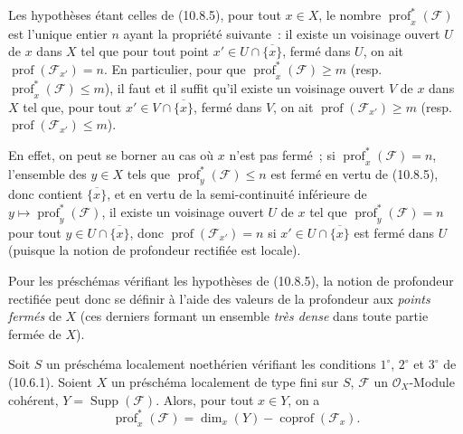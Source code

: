\begin{corollary}[10.8.6]
\label{IV.10.8.6-fr}
Les hypothèses étant celles de (10.8.5), pour tout $x\in X$, le nombre
$\operatorname{prof}^{*}_{x}(\mathcal F)$ est l'unique entier $n$ ayant la propriété
suivante~: il existe un voisinage ouvert $U$ de $x$ dans $X$ tel que pour tout
point $x'\in U\cap\overline{\{x\}}$, fermé dans $U$, on ait
$\operatorname{prof}(\mathcal F_{x'})=n$. En particulier, pour que
$\operatorname{prof}^{*}_{x}(\mathcal F)\geq m$ (resp.
$\operatorname{prof}^{*}_{x}(\mathcal F)\leq m$), il faut et il suffit qu'il existe
un voisinage ouvert $V$ de $x$ dans $X$ tel que, pour tout
$x'\in V\cap\overline{\{x\}}$, fermé dans $V$, on ait
$\operatorname{prof}(\mathcal F_{x'})\geq m$ (resp.
$\operatorname{prof}(\mathcal F_{x'})\leq m$).
\end{corollary}

En effet, on peut se borner au cas où $x$ n'est pas fermé~; si
$\operatorname{prof}^{*}_{x}(\mathcal F)=n$, l'ensemble des $y\in X$ tels que
$\operatorname{prof}^{*}_{y}(\mathcal F)\leq n$ est fermé en vertu de (10.8.5), donc
contient $\overline{\{x\}}$, et en vertu de la semi-continuité inférieure de
$y\mapsto\operatorname{prof}^{*}_{y}(\mathcal F)$, il existe un voisinage ouvert $U$
de $x$ tel que $\operatorname{prof}^{*}_{y}(\mathcal F)=n$ pour tout
$y\in U\cap\overline{\{x\}}$, donc $\operatorname{prof}(\mathcal F_{x'})=n$ si
$x'\in U\cap\overline{\{x\}}$ est fermé dans $U$ (puisque la notion de profondeur
rectifiée est locale).

Pour les préschémas vérifiant les hypothèses de (10.8.5), la notion de profondeur
rectifiée peut donc se définir à l'aide des valeurs de la profondeur aux
\emph{points fermés} de $X$ (ces derniers formant un ensemble \emph{très dense}
dans toute partie fermée de $X$).

\begin{proposition}[10.8.7]
\label{IV.10.8.7-fr}
Soit $S$ un préschéma localement noethérien vérifiant les conditions $1^\circ$,
$2^\circ$ et $3^\circ$ de (10.6.1). Soient $X$ un préschéma localement de type
fini sur $S$, $\mathcal F$ un $\mathcal O_X$-Module cohérent,
$Y=\operatorname{Supp}(\mathcal F)$. Alors, pour tout $x\in Y$, on a
\begin{equation}
\label{IV.10.8.7.1-fr}
\tag{10.8.7.1}
\operatorname{prof}^{*}_{x}(\mathcal F)
=\dim_x(Y)-\operatorname{coprof}(\mathcal F_x).
\end{equation}
\end{proposition}

